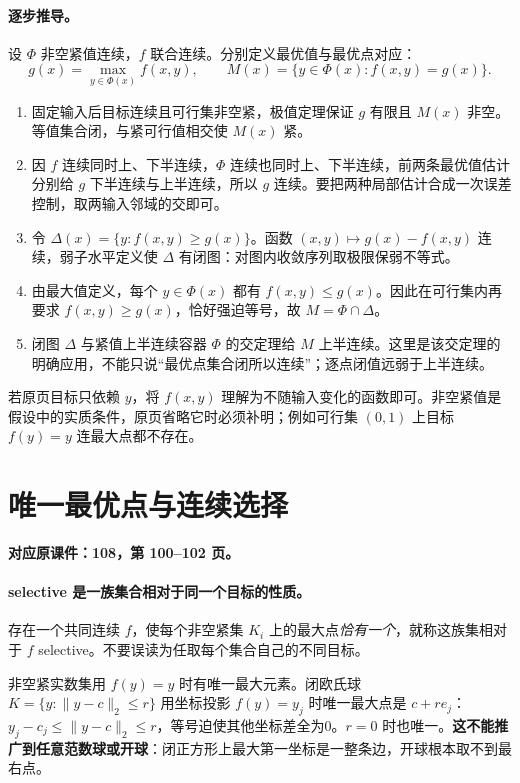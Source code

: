 \documentclass[11pt,a4paper]{article}
\theoremstyle{definition}\newtheorem{definition}{定义}\newtheorem{example}{例}
\begin{document}
\paragraph{逐步推导。}
设 $\Phi$ 非空紧值连续，$f$ 联合连续。分别定义最优值与最优点对应：
\[g(x)=\max_{y\in\Phi(x)}f(x,y),\qquad M(x)=\{y\in\Phi(x):f(x,y)=g(x)\}.\]
\begin{enumerate}
\item 固定输入后目标连续且可行集非空紧，极值定理保证 $g$ 有限且 $M(x)$ 非空。等值集合闭，与紧可行值相交使 $M(x)$ 紧。
\item 因 $f$ 连续同时上、下半连续，$\Phi$ 连续也同时上、下半连续，前两条最优值估计分别给 $g$ 下半连续与上半连续，所以 $g$ 连续。要把两种局部估计合成一次误差控制，取两输入邻域的交即可。
\item 令 $\Delta(x)=\{y:f(x,y)\ge g(x)\}$。函数 $(x,y)\mapsto g(x)-f(x,y)$ 连续，弱子水平定义使 $\Delta$ 有闭图：对图内收敛序列取极限保弱不等式。
\item 由最大值定义，每个 $y\in\Phi(x)$ 都有 $f(x,y)\le g(x)$。因此在可行集内再要求 $f(x,y)\ge g(x)$，恰好强迫等号，故 $M=\Phi\cap\Delta$。
\item 闭图 $\Delta$ 与紧值上半连续容器 $\Phi$ 的交定理给 $M$ 上半连续。这里是该交定理的明确应用，不能只说“最优点集合闭所以连续”；逐点闭值远弱于上半连续。
\end{enumerate}
若原页目标只依赖 $y$，将 $f(x,y)$ 理解为不随输入变化的函数即可。非空紧值是假设中的实质条件，原页省略它时必须补明；例如可行集 $(0,1)$ 上目标 $f(y)=y$ 连最大点都不存在。


\clearpage\section{唯一最优点与连续选择}\label{g:108:100}

\textbf{对应原课件：108，第 100--102 页。}


\paragraph{selective 是一族集合相对于同一个目标的性质。}
存在一个共同连续 $f$，使每个非空紧集 $K_i$ 上的最大点\emph{恰有一个}，就称这族集相对于 $f$ selective。不要误读为任取每个集合自己的不同目标。

非空紧实数集用 $f(y)=y$ 时有唯一最大元素。闭欧氏球 $K=\{y:\|y-c\|_2\le r\}$ 用坐标投影 $f(y)=y_j$ 时唯一最大点是 $c+re_j$：$y_j-c_j\le\|y-c\|_2\le r$，等号迫使其他坐标差全为0。$r=0$ 时也唯一。\textbf{这不能推广到任意范数球或开球}：闭正方形上最大第一坐标是一整条边，开球根本取不到最右点。
\end{document}
